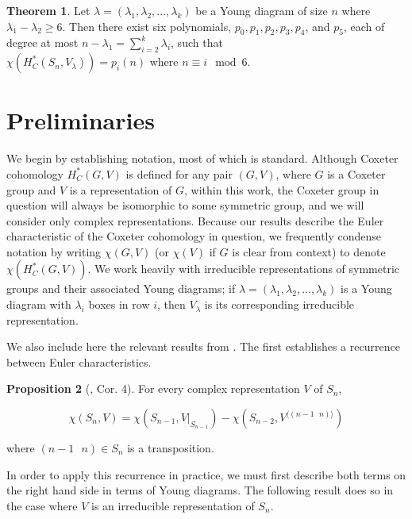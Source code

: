 \documentclass[12pt]{amsart}
\theoremstyle{definition}
\newtheorem{thm}{Theorem}
\newtheorem{prop}[thm]{Proposition}
\begin{document}
\begin{thm}
Let $\lambda = (\lambda_1, \lambda_2, ..., \lambda_k)$ be a Young diagram of size $n$ where $\lambda_1 - \lambda_2 \geq 6$. Then there exist six polynomials, $p_0, p_1, p_2, p_3, p_4$, and $p_5$, each of degree at most $n - \lambda_1 = \sum_{i=2}^k \lambda_i$, such that \\ $\chi(H^*_C(S_n, V_{\lambda})) = p_i(n)$ where $n \equiv i \mod 6$.
\end{thm}



\section{Preliminaries}
\label{prelim}

We begin by establishing notation, most of which is standard. Although Coxeter cohomology $H^*_C(G,V)$ is defined for any pair $(G, V)$, where $G$ is a Coxeter group and $V$ is a representation of $G$, within this work, the Coxeter group in question will always be isomorphic to some symmetric group, and we will consider only complex representations.
Because our results describe the Euler characteristic of the Coxeter cohomology in question, we frequently condense notation by writing $\chi(G, V )$ (or $\chi(V)$ if $G$ is clear from context) to denote $\chi(H_C^* (G, V))$. We work heavily with irreducible representations of symmetric groups and their associated Young diagrams; if $\lambda = (\lambda_1, \lambda_2, ..., \lambda_k)$ is a Young diagram with $\lambda_i$ boxes in row $i$, then $V_{\lambda}$ is its corresponding irreducible representation. 

We also include here the relevant results from \cite{B}. The first establishes a recurrence between Euler characteristics. 

\begin{prop}[\cite{B}, Cor. 4]
For every complex representation $V$ of $S_n$,

\[\chi(S_n,V)=\chi(S_{n-1},V|_{S_{n-1}})-\chi(S_{n-2},V^{\langle(n-1\text{ }n)\rangle})\]

where $(n-1 \text{ } n) \in S_n$ is a transposition.

\end{prop}

In order to apply this recurrence in practice, we must first describe both terms on the right hand side in terms of Young diagrams. The following result does so in the case where $V$ is an irreducible representation of $S_n$.
\end{document}
